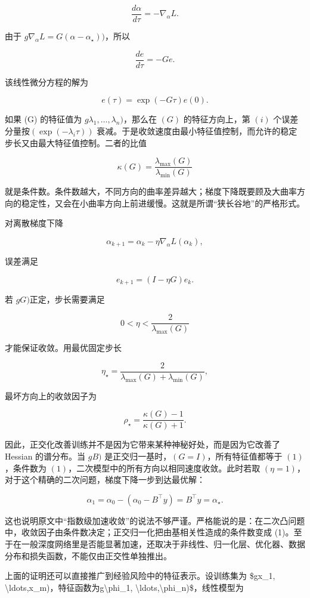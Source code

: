 \[
\frac{d\alpha}{d\tau}=-\nabla_\alpha L.
\]

由于 \(g\nabla_\alpha L=G(\alpha-\alpha_\star))\)，所以

\[
\frac{de}{d\tau}=-Ge.
\]

该线性微分方程的解为

\[
e(\tau)=\exp(-G\tau)e(0).
\]

如果 (G) 的特征值为 \(g\lambda_1,\ldots,\lambda_n)\)，那么在 \((G)\) 的特征方向上，第 \((i)\) 个误差分量按\( (\exp(-\lambda_i\tau))\) 衰减。于是收敛速度由最小特征值控制，而允许的稳定步长又由最大特征值控制。二者的比值

\[
\kappa(G)=\frac{\lambda_{\max}(G)}{\lambda_{\min}(G)}
\]

就是条件数。条件数越大，不同方向的曲率差异越大；梯度下降既要顾及大曲率方向的稳定性，又会在小曲率方向上前进缓慢。这就是所谓“狭长谷地”的严格形式。

对离散梯度下降

\[
\alpha_{k+1}=\alpha_k-\eta\nabla_\alpha L(\alpha_k),
\]

误差满足

\[
e_{k+1}=(I-\eta G)e_k.
\]

若 \(gG)\)正定，步长需要满足

\[
0<\eta<\frac{2}{\lambda_{\max}(G)}
\]

才能保证收敛。用最优固定步长

\[
\eta_\star=\frac{2}{\lambda_{\max}(G)+\lambda_{\min}(G)},
\]

最坏方向上的收敛因子为

\[
\rho_\star=\frac{\kappa(G)-1}{\kappa(G)+1}.
\]

因此，正交化改善训练并不是因为它带来某种神秘好处，而是因为它改善了 Hessian 的谱分布。当 \(gB)\) 是正交归一基时，\((G=I)\)，所有特征值都等于 \((1)\)，条件数为 \((1)\)，二次模型中的所有方向以相同速度收敛。此时若取 \((\eta=1)\)，对于这个精确的二次问题，梯度下降一步到达最优解：

\[
\alpha_{1}=\alpha_0-(\alpha_0-B^\top y)=B^\top y=\alpha_\star.
\]

这也说明原文中“指数级加速收敛”的说法不够严谨。严格能说的是：在二次凸问题中，收敛因子由条件数决定；正交归一化把由基相关性造成的条件数变成 (1)。至于在一般深度网络里是否能显著加速，还取决于非线性、归一化层、优化器、数据分布和损失函数，不能仅由正交性单独推出。

上面的证明还可以直接推广到经验风险中的特征表示。设训练集为 \$gx\_1,
\textbackslash{}ldots,x\_m)\(，特征函数为 \)g\textbackslash{}phi\_1,
\textbackslash{}ldots,\textbackslash{}phi\_n)\$，线性模型为

